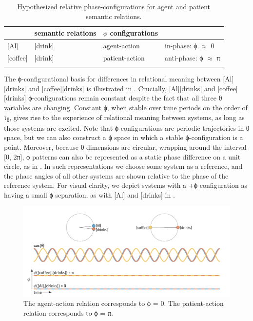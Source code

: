   \begin{table}
\begin{tabularx}{\textwidth}{XXll}
  \lsptoprule
  \multicolumn{2}{c}{\textbf{conceptual systems}} & 
  \textbf{semantic relations} & 
  \textbf{$\phi$ configurations}\\
  \midrule{}
  [Al] & [drink] & agent-action & in-phase: ϕ ${\approx}$ 0\\{}
  [coffee] & [drink] & patient-action & anti-phase: ϕ ${\approx}$ π\\
  \lspbottomrule
  \end{tabularx}
\caption{Hypothesized relative phase-configurations for agent and patient semantic relations.}
\label{tab:1:1}
\end{table}

  The ϕ-configurational basis for differences in relational meaning between [Al][drinks] and [coffee][drinks] is illustrated in {}. Crucially, [Al][drinks] and [coffee][drinks] ϕ-configurations remain constant despite the fact that all three θ variables are changing. Constant ϕ, when stable over time periods on the order of τ\textsubscript{θ}, gives rise to the experience of relational meaning between systems, as long as those systems are excited. Note that ϕ-configurations are periodic trajectories in θ space, but we can also construct a ϕ space in which a stable ϕ-configuration is a point. Moreover, because θ dimensions are circular, wrapping around the interval [0, 2π], ϕ patterns can also be represented as a static phase difference on a unit circle, as in {}. In such representations we choose some system as a reference, and the phase angles of all other systems are shown relative to the phase of the reference system. For visual clarity, we depict systems with a +ϕ configuration as having a small ϕ separation, as with [Al] and [drinks] in {}.

  
\begin{figure}
\includegraphics[width=\textwidth]{figures/Tilsen-img15.png}
\caption{The agent-action relation corresponds to ϕ = 0. The patient-action relation corresponds to ϕ = π.}
\label{fig:2:8}
\end{figure}
 

